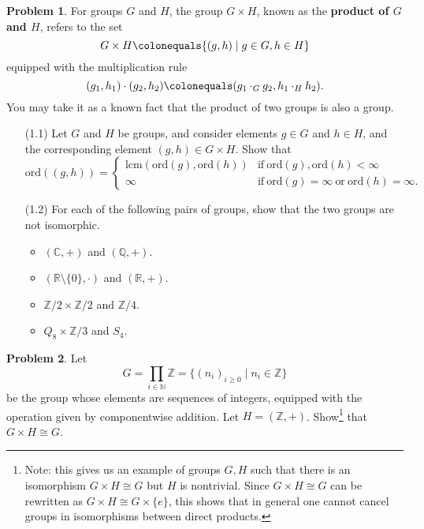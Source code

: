 \documentclass[11pt]{article}
\newcommand{\C}{\mathbb{C}}
\newcommand{\Q}{\mathbb{Q}}
\newcommand{\ZZ}{\mathbb{Z}}
\newcommand{\R}{\mathbb{R}}
\newcommand{\N}{\mathbb{N}}
\theoremstyle{definition}
\newtheorem{problem}{Problem}
\begin{document}
\begin{problem} For groups $G$ and $H$, the group $G \times H$, known as the {\bf product of $G$ and $H$}, refers to the set 
$$G \times H \colonequals \{ (g,h) \mid g \in G, h \in H \}$$
equipped with the multiplication rule 
$$(g_1, h_1) \cdot (g_2, h_2) \colonequals (g_1 \cdot_G g_2, h_1 \cdot_H h_2).$$ 
You may take it as a known fact that the product of two groups is also a group.
\begin{enumerate}
\item[(1.1)]	Let $G$ and $H$ be groups, and consider elements $g \in G$ and $h \in H$, and the corresponding element $(g,h)\in G\times H$. Show that
	\[ \mathrm{ord}((g,h)) = \begin{cases} \mathrm{lcm}( \mathrm{ord}(g) , \mathrm{ord}(h) ) & \text{if} \ \mathrm{ord}(g) ,\mathrm{ord}(h) < \infty \\ 
	\infty & \text{if} \ \mathrm{ord}(g)=\infty \ \text{or} \ \mathrm{ord}(h)=\infty.\end{cases}\]
\item[(1.2)] For each of the following pairs of groups, show that the two groups are not isomorphic.
\begin{itemize}
\item $(\C, +)$ and $(\Q, +)$.
  
\item $(\R \setminus \{0\}, \cdot)$ and $(\R, +)$.

\item $\ZZ/2 \times \ZZ/2$ and $\ZZ/4$.

\item $Q_8 \times \ZZ/3$ and $S_4$.
\end{itemize}
\end{enumerate}
\end{problem} 





\begin{problem}
Let 
$$G=\prod_{i\in \N} \ZZ = \{ (n_i)_{i \geqslant 0} \mid n_i \in \ZZ \}$$ 
be the group whose elements are sequences of integers, equipped with the operation given by componentwise addition. Let $H=(\ZZ,+)$. Show\footnote{Note: this gives us an example of groups $G,H$ such that there is an isomorphism $G\times H\cong G$ but $H$ is nontrivial. Since $G\times H \cong G$ can be rewritten as $G\times H\cong G\times \{e\}$, this shows that in general one cannot cancel groups in isomorphisms between direct products.} that $G\times H \cong G$.
\end{problem}
\end{document}
